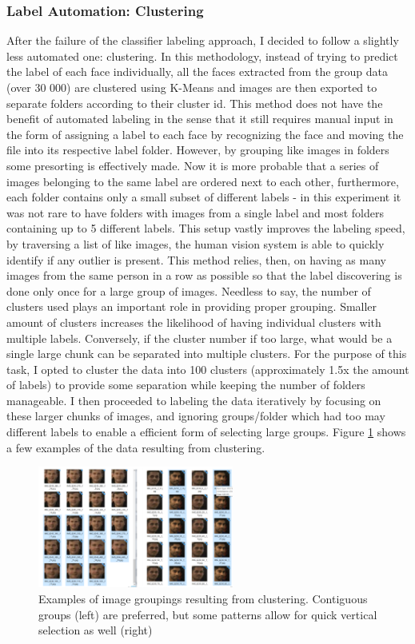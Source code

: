 \documentclass[11pt]{article}
\begin{document}
    \subsubsection{Label Automation: Clustering}\label{sec:face_labeling:clustering}
        After the failure of the classifier labeling approach, I decided to follow a slightly less automated one: clustering. In this methodology, instead of trying to predict the label of each face individually, all the faces extracted from the group data (over 30 000) are clustered using K-Means and images are then exported to separate folders according to their cluster id. This method does not have the benefit of automated labeling in the sense that it still requires manual input in the form of assigning a label to each face by recognizing the face and moving the file into its respective label folder. However, by grouping like images in folders some presorting is effectively made. Now it is more probable that a series of images belonging to the same label are ordered next to each other, furthermore, each folder contains only a small subset of different labels - in this experiment it was not rare to have folders with images from a single label and most folders containing up to 5 different labels. This setup vastly improves the labeling speed, by traversing a list of like images, the human vision system is able to quickly identify if any outlier is present. This method relies, then, on having as many images from the same person in a row as possible so that the label discovering is done only once for a large group of images. Needless to say, the number of clusters used plays an important role in providing proper grouping. Smaller amount of clusters increases the likelihood of having individual clusters with multiple labels. Conversely, if the cluster number if too large, what would be a single large chunk can be separated into multiple clusters. For the purpose of this task, I opted to cluster the data into 100 clusters (approximately 1.5x the amount of labels) to provide some separation while keeping the number of folders manageable. I then proceeded to labeling the data iteratively by focusing on these larger chunks of images, and ignoring groups/folder which had too may different labels to enable a efficient form of selecting large groups. Figure \ref{fig:label:samples} shows a few examples of the data resulting from clustering.
        \begin{figure}[ht]
            \centering
            \includegraphics[height=4cm]{./Images/labeling/samples.png}
            \caption{Examples of image groupings resulting from clustering. Contiguous groups (left) are preferred, but some patterns allow for quick vertical selection as well (right)}
            \label{fig:label:samples}
        \end{figure}
\end{document}
